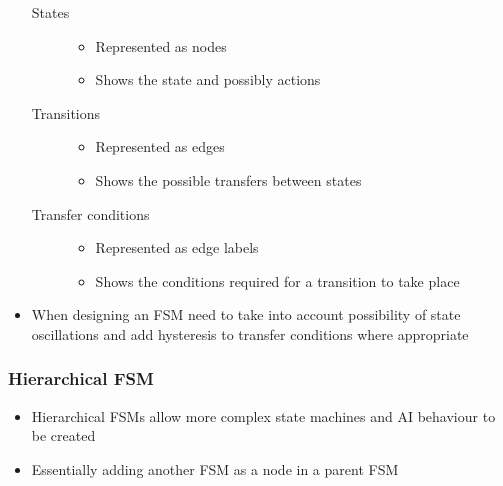 \documentclass[a4paper]{article}
\begin{document}
\begin{itemize}
    \begin{description}
      \item[States] \hfill
        \begin{itemize}
          \item
            Represented as nodes

          \item
            Shows the state and possibly actions

        \end{itemize}

      \item[Transitions] \hfill
        \begin{itemize}
          \item
            Represented as edges

          \item
            Shows the possible transfers between states

        \end{itemize}

      \item[Transfer conditions] \hfill
        \begin{itemize}
          \item
            Represented as edge labels

          \item
            Shows the conditions required for a transition to take place

        \end{itemize}

    \end{description}

  \item
    When designing an FSM need to take into account possibility of state
    oscillations and add hysteresis to transfer conditions where appropriate

\end{itemize}

\subsubsection{Hierarchical FSM}

\begin{itemize}
  \item
    Hierarchical FSMs allow more complex state machines and AI behaviour to be
    created

  \item
    Essentially adding another FSM as a node in a parent FSM

\end{itemize}
\end{document}
